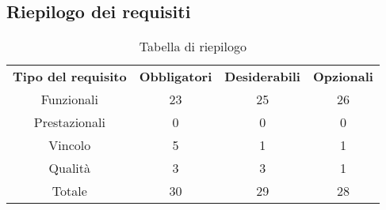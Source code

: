 \subsection{Riepilogo dei requisiti}
\begin{table}[h]
\centering
\begin{tabular}{| c | c | c | c |}
		\rowcolor{LightBlue}
		\color{white}\bfseries Tipo del requisito & \color{white}\bfseries Obbligatori & \color{white}\bfseries Desiderabili & \color{white}\bfseries Opzionali \\[0.25cm]
		 Funzionali & 23 & 25 & 26 \\
		 Prestazionali & 0 & 0 & 0 \\
		 Vincolo & 5 & 1 & 1 \\
		 Qualità & 3 & 3 & 1 \\
		 Totale & 30 & 29 & 28 \\ \hline
\end{tabular}
		\caption{Tabella di riepilogo}
\end{table}


\newpage